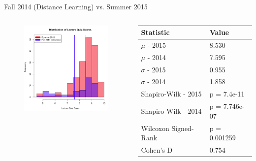 \documentclass{beamer}
\begin{document}
\begin{frame}{Fall 2014 (Distance Learning) vs. Summer 2015}
\begin{columns}
\begin{column}{2in}
\begin{figure}
	\includegraphics[width=2in]{img/chapter4/lq_su15_vs_f14d}
\end{figure}
\end{column}
\begin{column}{2in}
\begin{scriptsize}
\begin{table}
  \begin{tabular}{|l|l|}
    \hline
    \textbf{Statistic} & \textbf{Value} \\
	\hline
	$\mu$ - 2015 & 8.530 \\
	\hline
	$\mu$ - 2014 & 7.595 \\
	\hline
	$\sigma$ - 2015 & 0.955 \\
	\hline
	$\sigma$ - 2014 & 1.858 \\
	\hline
	Shapiro-Wilk - 2015 & p = 7.4e-11 \\
	\hline
	Shapiro-Wilk - 2014 & p = 7.746e-07 \\
	\hline
	Wilcoxon Signed-Rank & p = 0.001259 \\
	\hline
	Cohen's D & 0.754 \\
	\hline
  \end{tabular}
\end{table}
\end{scriptsize}
\end{column}
\end{columns}
\end{frame}
\end{document}
